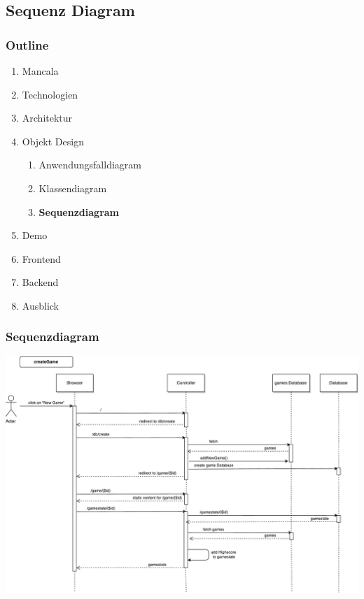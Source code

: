 \documentclass[
	10pt,
	t		%
]{beamer}
\begin{document}
\subsection{Sequenz Diagram}
\begin{frame}
\frametitle{Outline}
\begin{enumerate}
\item Mancala
\item Technologien
\item Architektur
\item Objekt Design
\begin{enumerate}
\item Anwendungsfalldiagram
\item Klassendiagram
\item \textbf{Sequenzdiagram}
\end{enumerate}
\item Demo
\item Frontend
\item Backend
\item Ausblick
\end{enumerate}
\end{frame}

\begin{frame}
\frametitle{Sequenzdiagram}
\begin{center}
\includegraphics[scale=0.25]{./../Diagrams/Sequence_createGame.pdf}
\end{center}
\end{frame}
\end{document}
